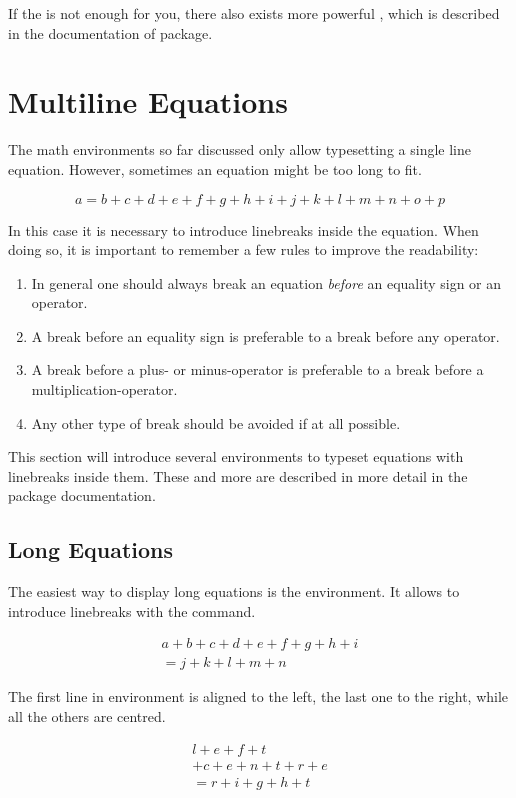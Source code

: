 If the  is not enough for you, there also exists
more powerful , which is described in the
documentation of  package.

\section{Multiline Equations}

The math environments so far discussed only allow typesetting a single line
equation. However, sometimes an equation might be too long to fit.
\begin{example}
\begin{equation}
  a = b + c + d + e + f 
  + g + h + i + j 
  + k + l + m + n + o + p  
\end{equation}
\end{example}
In this case it is necessary to introduce linebreaks inside the equation. When
doing so, it is important to remember a few rules to improve the readability:
\begin{enumerate}
  \item In general one should always break an equation \emph{before} an
        equality sign or an operator.
  \item A break before an equality sign is preferable to a break before
        any operator.
  \item A break before a plus- or minus-operator is preferable to a break
        before a multiplication-operator.
  \item Any other type of break should be avoided if at all possible.
\end{enumerate}

This section will introduce several environments to typeset equations with
linebreaks inside them. These and more are described in more detail in the
 package documentation.

\subsection{Long Equations}\label{sec:multline}

The easiest way to display long equations is the  environment. It
allows to introduce linebreaks with the \csi{\bs} command.
\begin{example}
\begin{multline}
  a + b + c + d + e + f
  + g + h + i \\
  = j + k + l + m + n
\end{multline}
\end{example}
The first line in  environment is aligned to the left, the last
one to the right, while all the others are centred.
\begin{example}
\begin{multline}
  l + e + f + t \\
  + c + e + n + t + r + e \\
  = r + i + g + h + t
\end{multline}
\end{example}

